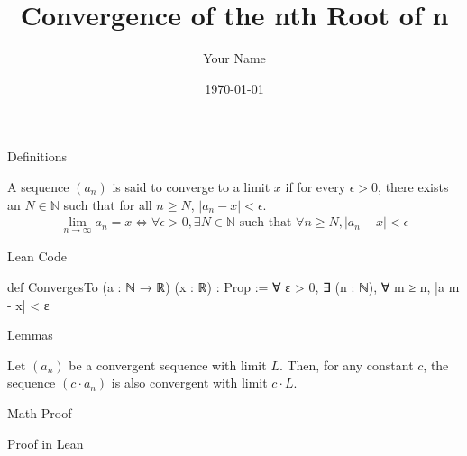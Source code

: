 \documentclass{beamer}
\title{Convergence of the nth Root of n}
\author{Your Name}
\date{\today}
\begin{document}
\begin{frame}
    \titlepage
\end{frame}

\begin{frame}[fragile]{Definitions}
    \begin{definition}
        A sequence $(a_n)$ is said to converge to a limit $x$ if for every $\epsilon > 0$, there exists an $N \in \mathbb{N}$ such that for all $n \geq N$, $|a_n - x| < \epsilon$.
        \begin {align*}
            \lim_{n \to \infty} a_n = x \iff \forall \epsilon > 0, \exists N \in \mathbb{N} \text{ such that } \forall n \geq N, |a_n - x| < \epsilon
        \end {align*}
    \end{definition}
    
    \begin{block}{Lean Code}
    \begin{leancode}
        def ConvergesTo (a : ℕ → ℝ) (x : ℝ) : Prop := 
            ∀ ε > 0, ∃ (n : ℕ), ∀ m ≥ n, |a m - x| < ε
    \end{leancode}
    \end{block}

\end{frame}

\begin{frame}[fragile]{Lemmas}
    \begin{lemma}
        Let $(a_n)$ be a convergent sequence with limit $L$. Then, for any constant $c$, the sequence $(c \cdot a_n)$ is also convergent with limit $c \cdot L$.
    \end{lemma}
\end{frame}

\begin{frame}{Math Proof}
\end{frame}

\begin{frame}{Proof in Lean}
\end{frame}
\end{document}
